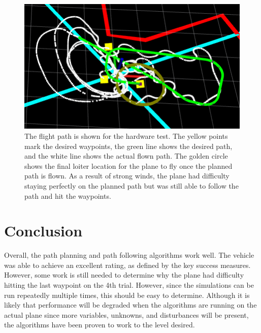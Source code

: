 \documentclass[]{auvsi_doc}
\begin{document}
\begin{figure}
    \centering
    \includegraphics[width=.75\textwidth]{WaypointTest.png}
    \caption{The flight path is shown for the hardware test. The yellow points mark the desired waypoints, the green line shows the desired path, and the white line shows the actual flown path. The golden circle shows the final loiter location for the plane to fly once the planned path is flown. As a result of strong winds, the plane had difficulty staying perfectly on the planned path but was still able to follow the path and hit the waypoints.}
    \label{fig:flight}
\end{figure}


\section*{Conclusion}

Overall, the path planning and path following algorithms work well. The vehicle was able to achieve an excellent rating, as defined by the key success measures.
However, some work is still needed to determine why the plane had difficulty hitting the last waypoint on the 4th trial. However, since the simulations can be run repeatedly multiple times, this should be easy to determine.
Although it is likely that performance will be degraded when the algorithms are running on the actual plane since more variables, unknowns, and disturbances will be present, the algorithms have been proven to work to the level desired.

\end{document}
